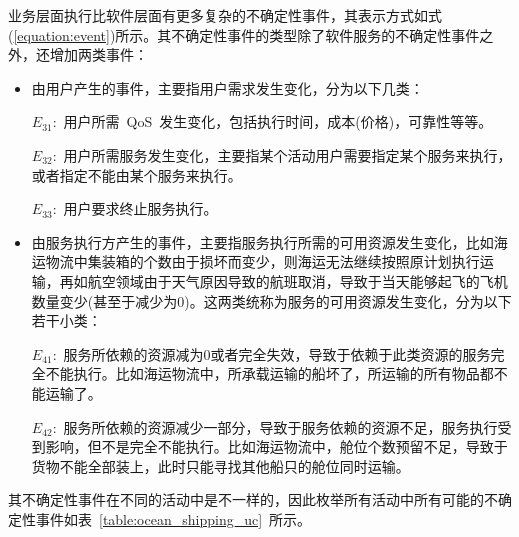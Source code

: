 业务层面执行比软件层面有更多复杂的不确定性事件，其表示方式如式(\ref{equation:event})所示。其不确定性事件的类型除了软件服务的不确定性事件之外，还增加两类事件：

\begin{itemize}
    
    \item 由用户产生的事件，主要指用户需求发生变化，分为以下几类：
    
    $E_{31}$:~用户所需~QoS~发生变化，包括执行时间，成本(价格)，可靠性等等。
    
    $E_{32}$:~用户所需服务发生变化，主要指某个活动用户需要指定某个服务来执行，或者指定不能由某个服务来执行。
    
    $E_{33}$:~用户要求终止服务执行。
    
    \item 由服务执行方产生的事件，主要指服务执行所需的可用资源发生变化，比如海运物流中集装箱的个数由于损坏而变少，则海运无法继续按照原计划执行运输，再如航空领域由于天气原因导致的航班取消，导致于当天能够起飞的飞机数量变少(甚至于减少为0)。这两类统称为服务的可用资源发生变化，分为以下若干小类：
    
    $E_{41}$:~服务所依赖的资源减为0或者完全失效，导致于依赖于此类资源的服务完全不能执行。比如海运物流中，所承载运输的船坏了，所运输的所有物品都不能运输了。
    
    $E_{42}$:~服务所依赖的资源减少一部分，导致于服务依赖的资源不足，服务执行受到影响，但不是完全不能执行。比如海运物流中，舱位个数预留不足，导致于货物不能全部装上，此时只能寻找其他船只的舱位同时运输。
    
    
\end{itemize}

其不确定性事件在不同的活动中是不一样的，因此枚举所有活动中所有可能的不确定性事件如表~\ref{table:ocean_shipping_uc}~所示。

